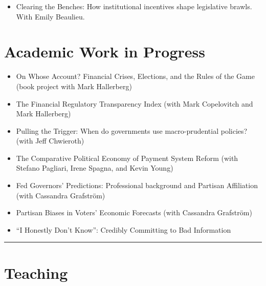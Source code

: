 \documentclass[a4paper]{article}
\begin{document}
{{\begin{itemize}
        \begin{itemize}
            \item Write up on the \href{http://t.co/fETbFCXcYU}{Monkey Cage} with Emily Beaulieu.
        \end{itemize}

    \item Clearing the Benches: How institutional incentives shape legislative brawls. With Emily Beaulieu.

\end{itemize}

\section*{Academic Work in Progress}

\begin{itemize}

    \item On Whose Account? Financial Crises, Elections, and the Rules of the Game (book project with Mark Hallerberg)

    \item The Financial Regulatory Transparency Index (with Mark Copelovitch and Mark Hallerberg)

    \item Pulling the Trigger: When do governments use macro-prudential policies? (with Jeff Chwieroth)

    \item The Comparative Political Economy of Payment System Reform (with Stefano Pagliari, Irene Spagna, and Kevin Young)

    \item Fed Governors' Predictions: Professional background and Partisan Affiliation (with Cassandra Grafstr\"{o}m)

    \item Partisan Biases in Voters' Economic Forecasts (with Cassandra Grafstr\"{o}m)

    \item ``I Honestly Don't Know'': Credibly Committing to Bad Information

\end{itemize}


\vspace{0.25cm}
\medskip\hrule height 1pt
\vspace{0.5cm}

\section*{Teaching}

}}
\end{document}
